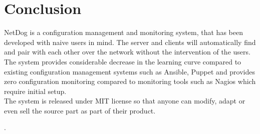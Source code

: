 \chapter{Conclusion}

\par
NetDog is a configuration management and monitoring system, that has been
developed with naive users in mind. The server and clients will automatically
find and pair with each other over the network without the intervention of the
users.\\

The system provides considerable decrease in the learning curve compared to
existing configuration management systems such as Ansible, Puppet and provides
zero configuration monitoring compared to monitoring tools such as Nagios which
require initial setup.\\

The system is released under MIT license so that anyone can modify, adapt or
even sell the source part as part of their product.


.
